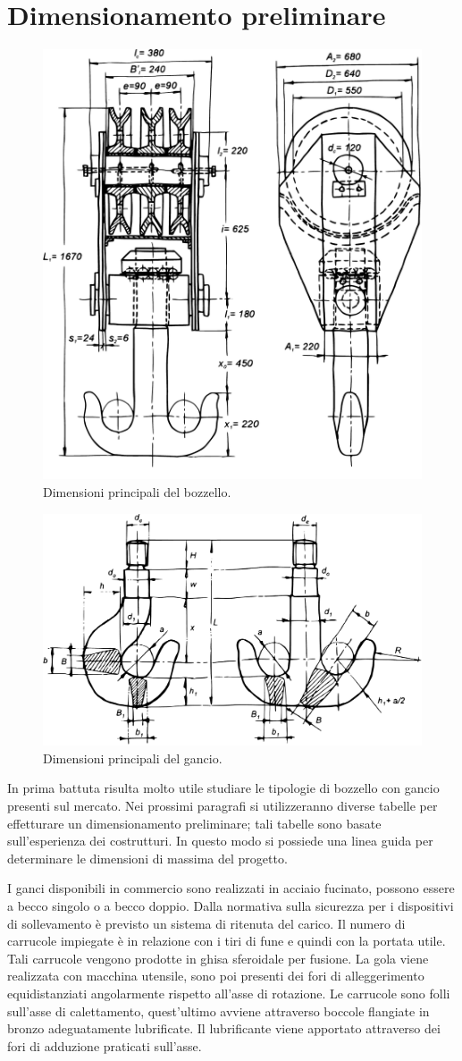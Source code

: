 \section{Dimensionamento preliminare}
\begin{figure}[H]
\centering
  \includegraphics[width=.5\textwidth]{imgs/Cap5/1 DimPrel}
\caption{Dimensioni principali del bozzello.}
\label{fig:DimPrel1}
\end{figure}
\begin{figure}[H]
\centering
  \includegraphics[width=.6\textwidth]{imgs/GancioGen}
\caption{Dimensioni principali del gancio.}
\label{fig:GancioGen}
\end{figure}
In prima battuta risulta molto utile studiare le tipologie di bozzello con gancio presenti sul mercato.
Nei prossimi paragrafi si utilizzeranno diverse tabelle per effetturare un dimensionamento preliminare; tali tabelle sono basate sull'esperienza dei costrutturi. 
In questo modo si possiede una linea guida per determinare le dimensioni di massima del progetto. 

I ganci disponibili in commercio sono realizzati in acciaio fucinato, possono essere a becco singolo o a becco doppio. 
Dalla normativa sulla sicurezza per i dispositivi di sollevamento è previsto un sistema di ritenuta del carico. 
Il numero di carrucole impiegate è in relazione con i tiri di fune e quindi con la portata utile. Tali carrucole vengono prodotte in ghisa sferoidale per fusione.
La gola viene realizzata con macchina utensile, sono poi presenti dei fori di alleggerimento equidistanziati angolarmente rispetto all'asse di rotazione. 
Le carrucole sono folli sull'asse di calettamento, quest'ultimo avviene attraverso boccole flangiate in bronzo adeguatamente lubrificate. Il lubrificante viene apportato attraverso dei fori di adduzione praticati sull'asse.

